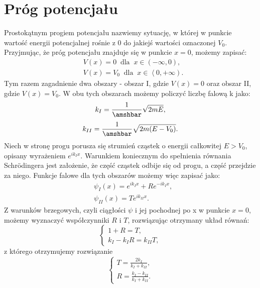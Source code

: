\documentclass{SGGW-thesis}
\begin{document}
	\section{Próg potencjału}
	Prostokątnym progiem potencjału nazwiemy sytuację, w której w punkcie wartość energii potencjalnej rośnie z $0$ do jakiejś wartości oznaczonej $V_0$. Przyjmując, że próg potencjału znajduje się w punkcie $x = 0 $, możemy zapisać:
	\begin{equation}
	\begin{split}
		&V(x) = 0 \;\; \textrm{dla} \;\; x \in \left(-\infty, 0\right), \\
		&V(x) = V_0 \;\; \textrm{dla} \;\; x \in \left<0, +\infty\right).
	\end{split}
	\end{equation}
Tym razem zagadnienie dwa obszary - obszar I, gdzie $V(x)=0$ oraz obszar II, gdzie $V(x)=V_0$. W obu tych obszarach możemy policzyć liczbę falową k jako:
	\begin{equation}
	k_I = \frac{1}{\amshbar}\sqrt{2mE}	,
	\end{equation}
	\begin{equation}
	k_{II} = \frac{1}{\amshbar}\sqrt{2m(E-V_0)}.
	\end{equation}
Niech w stronę progu porusza się strumień cząstek o energii całkowitej $E > V_0$, opisany wyrażeniem $e^{ik_Ix}$. Warunkiem koniecznym do spełnienia równania Schrödingera jest założenie, że część cząstek odbije się od progu, a część przejdzie za niego. Funkcje falowe dla tych obszarów możemy więc zapisać jako:
	\begin{equation}\label{eqn:potential-jump-solution}
	\begin{split}
	&\psi_I(x) = e^{ik_Ix} + Re^{-ik_Ix}, \\
	&\psi_{II}(x) = Te^{ik_{II}x}.
	\end{split}
	\end{equation}
Z warunków brzegowych, czyli ciągłości $\psi$ i jej pochodnej po x w punkcie $x=0$, możemy wyznaczyć współczynniki $R$ i $T$, rozwiązując otrzymany układ równań:
	\begin{equation}
	\begin{cases}
	1+ R = T, \\
	k_I-k_IR=k_{II}T,
	\end{cases}
	\end{equation}
z którego otrzymujemy rozwiązanie
	\begin{equation}
	\begin{cases}
	T = \frac{2k_I}{k_I+k_{II}}, \\
	R = \frac{k_I-k_{II}}{k_I+k_{II}}.
	\end{cases}
	\end{equation}
\end{document}
